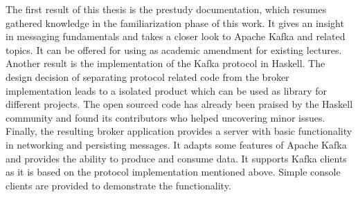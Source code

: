 The first result of this thesis is the prestudy documentation, which resumes
gathered knowledge in the familiarization phase of this work. It gives an
insight in messaging fundamentals and  takes a closer look to Apache Kafka and
related topics. It can be offered for using as academic amendment for existing
lectures. Another result is the implementation of the Kafka protocol in Haskell.
The design decision of separating protocol related code from the broker
implementation leads to a isolated product which can be used as library for
different projects. The open sourced code has already been praised by the
Haskell community and found its contributors who helped uncovering minor issues.
Finally, the resulting broker application provides a server with basic
functionality in networking and persisting messages. It adapts some features of
Apache Kafka and provides the ability to produce and consume data. It supports
Kafka clients as it is based on the protocol implementation mentioned above.
Simple console clients are provided to demonstrate the functionality.

